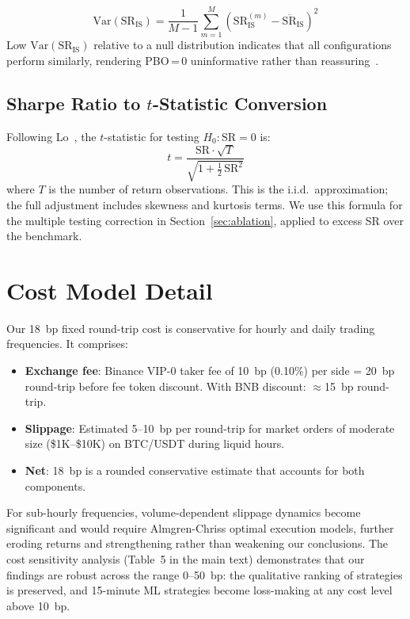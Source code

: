 \documentclass[sigconf,anonymous,review]{acmart}
\begin{document}
\begin{equation}
\mathrm{Var}(\mathrm{SR}_{\mathrm{IS}}) =
\frac{1}{M-1}\sum_{m=1}^{M}\left(\mathrm{SR}_{\mathrm{IS}}^{(m)}
- \overline{\mathrm{SR}}_{\mathrm{IS}}\right)^2
\end{equation}
Low $\mathrm{Var}(\mathrm{SR}_{\mathrm{IS}})$ relative to a null
distribution indicates that all configurations perform similarly,
rendering PBO\,=\,0 uninformative rather than
reassuring~\cite{witzany2021bayesian}.

\subsection{Sharpe Ratio to $t$-Statistic Conversion}

Following Lo~\cite{lo2002statistics}, the $t$-statistic for testing
$H_0: \mathrm{SR} = 0$ is:
\begin{equation}
t = \frac{\mathrm{SR} \cdot \sqrt{T}}
{\sqrt{1 + \tfrac{1}{2}\,\mathrm{SR}^2}}
\end{equation}
where $T$ is the number of return observations. This is the i.i.d.\
approximation; the full adjustment includes skewness and kurtosis
terms. We use this formula for the multiple testing correction in
Section~\ref{sec:ablation}, applied to excess SR over the benchmark.


\section{Cost Model Detail}
\label{app:cost}

Our 18~bp fixed round-trip cost is conservative for hourly and
daily trading frequencies. It comprises:

\begin{itemize}
\item \textbf{Exchange fee}: Binance VIP-0 taker fee of 10~bp
(0.10\%) per side = 20~bp round-trip before fee token discount.
With BNB discount: $\approx$15~bp round-trip.
\item \textbf{Slippage}: Estimated 5--10~bp per round-trip for
market orders of moderate size (\$1K--\$10K) on BTC/USDT during
liquid hours.
\item \textbf{Net}: 18~bp is a rounded conservative estimate that
accounts for both components.
\end{itemize}

For sub-hourly frequencies, volume-dependent slippage dynamics
become significant and would require Almgren-Chriss optimal
execution models, further eroding returns and strengthening
rather than weakening our conclusions. The cost sensitivity
analysis (Table~5 in the main text) demonstrates that our findings
are robust across the range 0--50~bp: the qualitative ranking of
strategies is preserved, and 15-minute ML strategies become
loss-making at any cost level above 10~bp.
\end{document}
